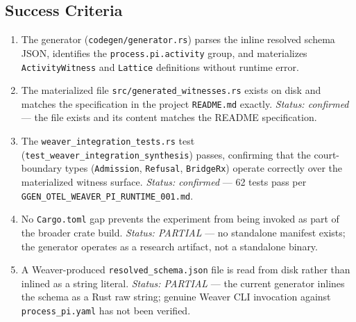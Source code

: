 \subsection{Success Criteria}
\label{sec:otel-weaver-exp-004-registry-to-witness-success}

\begin{enumerate}
  \item The generator (\texttt{codegen/generator.rs}) parses the inline resolved schema
    JSON, identifies the \texttt{process.pi.activity} group, and materializes
    \texttt{ActivityWitness} and \texttt{Lattice} definitions without runtime error.
  \item The materialized file \texttt{src/generated\_witnesses.rs} exists on disk and
    matches the specification in the project \texttt{README.md} exactly. \emph{Status:
    confirmed} --- the file exists and its content matches the README specification.
  \item The \texttt{weaver\_integration\_tests.rs} test
    (\texttt{test\_weaver\_integration\_synthesis}) passes, confirming that the
    court-boundary types (\texttt{Admission}, \texttt{Refusal}, \texttt{BridgeRx}) operate
    correctly over the materialized witness surface. \emph{Status: confirmed} ---
    62 tests pass per \texttt{GGEN\_OTEL\_WEAVER\_PI\_RUNTIME\_001.md}.
  \item No \texttt{Cargo.toml} gap prevents the experiment from being invoked as part of
    the broader crate build. \emph{Status: PARTIAL} --- no standalone manifest exists;
    the generator operates as a research artifact, not a standalone binary.
  \item A Weaver-produced \texttt{resolved\_schema.json} file is read from disk rather than
    inlined as a string literal. \emph{Status: PARTIAL} --- the current generator inlines
    the schema as a Rust raw string; genuine Weaver CLI invocation against
    \texttt{process\_pi.yaml} has not been verified.
\end{enumerate}
